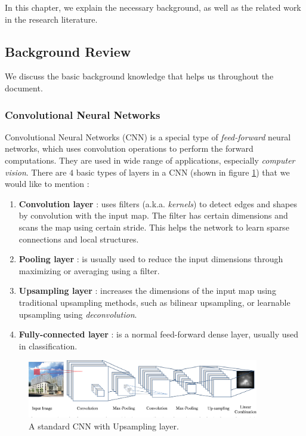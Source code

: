 In this chapter, we explain the necessary background, as well as the related work in the research literature.

\subsection{Background Review}
We discuss the basic background knowledge that helps us throughout the document.

\subsubsection{Convolutional Neural Networks}
Convolutional Neural Networks (CNN) is a special type of \emph{feed-forward} neural networks, which uses convolution operations to perform the forward computations. They are used in wide range of applications, especially \emph{computer vision}. There are $4$ basic types of layers in a CNN (shown in figure \ref{fig:cnn}) that we would like to mention :
\begin{enumerate}
    \item \textbf{Convolution layer} : uses filters (a.k.a. \emph{kernels}) to detect edges and shapes by convolution with the input map. The filter has certain dimensions and scans the map using certain stride. This helps the network to learn sparse connections and local structures.
    \item \textbf{Pooling layer} : is usually used to reduce the input dimensions through maximizing or averaging using a filter.
    \item \textbf{Upsampling layer} : increases the dimensions of the input map using traditional upsampling methods, such as bilinear upsampling, or learnable upsampling using \emph{deconvolution}.
    \item \textbf{Fully-connected layer} : is a normal feed-forward dense layer, usually used in classification.
\end{enumerate}

\begin{figure}[H]
    \centering
    \includegraphics[width=0.9\textwidth]{images/cnn.png}
    \caption{A standard CNN with Upsampling layer.}
    \label{fig:cnn}
\end{figure}

